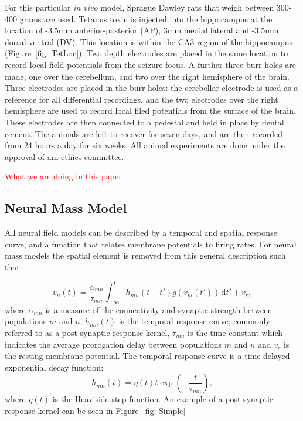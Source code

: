 \documentclass[10pt]{article}%
\newcommand\red{\textcolor{red}}
\begin{document}
For this particular \textsl{in vivo} model, Sprague Dawley rats that weigh between 300-400 grams are used. Tetanus toxin is injected into the hippocampus at the location of -3.5mm anterior-posterior (AP), 3mm medial lateral and -3.5mm dorsal ventral (DV). This location is within the CA3 region of the hippocampus (Figure~\ref{fig: TetLoc}). Two depth electrodes are placed in the same location to record local field potentials from the seizure focus. A further three burr holes are made, one over the cerebellum, and two over the right hemisphere of the brain. Three electrodes are placed in the burr holes: the cerebellar electrode is used as a reference for all differential recordings, and the two electrodes over the right hemisphere are used to record local filed potentials from the surface of the brain. These electrodes are then connected to a pedestal and held in place by dental cement. The animals are left to recover for seven days, and are then recorded from 24 hours a day for six weeks. All animal experiments are done under the approval of am ethics committee.

 

\red{ What we are doing in this paper}


\subsection{Neural Mass Model} 

All neural field models can be described by a temporal and spatial response curve, and a function that relates membrane potentials to firing rates. For neural mass models the spatial element is removed from this general description such that

\begin{equation}\label{eq:conv_eq}
    v_n(t) = \frac{\alpha_{mn}}{\tau_{mn}}\int_{-\infty}^t  h_{mn}(t-t')g(v_m(t')) \,\mathrm{d}t' + v_r,
\end{equation}
where $\alpha_{mn}$ is a measure of the connectivity and synaptic strength between populations $m$ and $n$, $h_{mn}(t)$ is the temporal response curve, commonly referred to as a post synaptic response kernel, $\tau_{mn}$ is the time constant which indicates the average prorogation delay between populations $m$ and $n$ and $v_r$ is the resting membrane potential. The temporal response curve is a time delayed exponential decay function:
\begin{equation}
    h_{mn}(t) = \eta(t)t\exp\left(-\frac{t}{\tau_{mn}}\right),
\end{equation}
where $\eta(t)$ is the Heaviside step function. An example of a post synaptic response kernel can be seen in Figure~\ref{fig: Simple}
\end{document}
